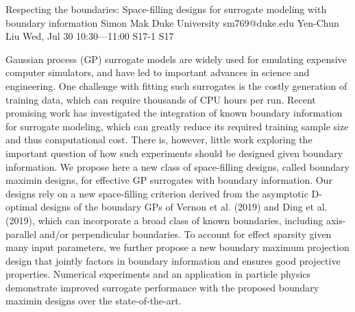 \begin{talk}
  {Respecting the boundaries: Space-filling designs for surrogate modeling with boundary information}%
  {Simon Mak}%
  {Duke University}%
  {sm769@duke.edu}%
  {Yen-Chun Liu}%
  {}%
  {Wed, Jul 30 10:30---11:00}%
  {S17-1}%
  {S17}%
  
    
   
Gaussian process (GP) surrogate models are widely used for emulating expensive computer simulators, and have led to important advances in science and engineering. One challenge with fitting such surrogates is the costly generation of training data, which can require thousands of CPU hours per run. Recent promising work has investigated the integration of known boundary information for surrogate modeling, which can greatly reduce its required training sample size and thus computational cost. There is, however, little work exploring the important question of how such experiments should be designed given boundary information. We propose here a new class of space-filling designs, called boundary maximin designs, for effective GP surrogates with boundary information. Our designs rely on a new space-filling criterion derived from the asymptotic D-optimal designs of the boundary GPs of Vernon et al. (2019) and Ding et al. (2019), which can incorporate a broad class of known boundaries, including axis-parallel and/or perpendicular boundaries. To account for effect sparsity given many input parameters, we further propose a new boundary maximum projection design that jointly factors in boundary information and ensures good projective properties. Numerical experiments and an application in particle physics demonstrate improved surrogate performance with the proposed boundary maximin designs over the state-of-the-art.
\medskip


\end{talk}

